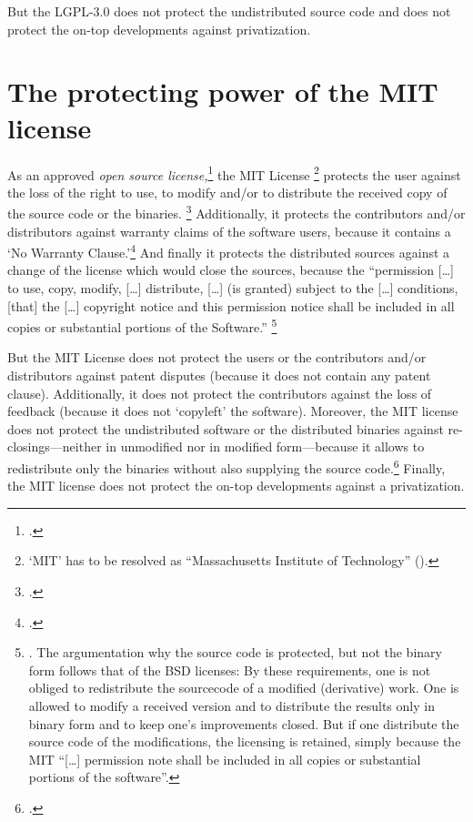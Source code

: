 But the LGPL-3.0 does not protect the undistributed source code and does not
protect the on-top developments against privatization.

\section{\texorpdfstring{The protecting power of the}{The} MIT license}

As an approved \emph{open source license,}\footcite[cf.][\nopage wp]{OSI2012b}
the MIT License%
  \footnote{`MIT' has to be resolved as \enquote{Massachusetts
  Institute of Technology} (\cite[cf.][\nopage wp]{wpMitLic2011a}).} 
protects the user against the loss of the right to use, to modify and/or to
distribute the received copy of the source code or the binaries.%
\footcite[cf.][\nopage wp 1ff]{OSI2012a} 
Additionally, it protects the contributors and/or distributors
against warranty claims of the software users, because it contains a `No
Warranty Clause.'\footcite[cf.][\nopage wp]{MitLicense2012a} And finally it
protects the distributed sources against a change of the license which would
close the sources, because the \enquote{permission [\ldots] to use, copy,
modify, [\ldots] distribute, [\ldots] (is granted) subject to the [\ldots]
conditions, [that] the [\ldots] copyright notice and this permission notice
shall be included in all copies or substantial portions of the
Software.}%
  \footnote{\cite[cf.][\nopage wp]{MitLicense2012a}. The argumentation
  why the source code is protected, but not the binary form follows that of the 
  BSD licenses: By these requirements, one is not obliged to redistribute the
  sourcecode of a modified (derivative) work. One is allowed to modify a received
  version and to distribute the results only in binary form and to keep one's
  improvements closed. But if one distribute the source code of the modifications,
  the licensing is retained, simply because the MIT \enquote{[\ldots] permission
  note shall be included in all copies or substantial portions of the software}.}

But the MIT License does not protect the users or the contributors and/or
distributors against patent disputes (because it does not contain any patent
clause). Additionally, it does not protect the contributors against the loss of
feedback (because it does not `copyleft' the software). Moreover, the MIT
license does not protect the undistributed software or the distributed binaries
against re-closings---neither in unmodified nor in modified form---because it
allows to redistribute only the binaries without also supplying the source
code.\footcite[cf.][\nopage wp]{MitLicense2012a} Finally, the MIT license does
not protect the on-top developments against a privatization.

